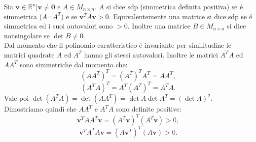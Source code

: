Sia $\mathbf{v} \in \mathbb{R}^n| \mathbf{v} \neq \mathbf{0}$ e $A \in M_{n \times n}$.
$A$ si dice sdp (simmetrica definita positiva) se \'e simmetrica ($A$=$A^T$) e se $\mathbf{v}^TA\mathbf{v} > 0.$
Equivalentemente una matrice si dice sdp se \'e simmetrica ed i suoi autovalori sono $> 0.$
Inoltre una matrice $B \in M_{n \times n}$ si dice nonsingolare se $\det{B} \neq 0.$
\\
Dal momento che il polinomio caratteristico \'e invariante per similitudine le matrici quadrate $A$ ed $A^T$ hanno gli stessi autovalori.
Inoltre le matrici $A^TA$ ed $AA^T$ sono simmetriche dal momento che:
\[
(AA^T)^T = (A^T)^TA^T = AA^T ,\] 
\[
(A^TA)^T = A^T(A^T)^T = A^TA.
\]
Vale poi $\det{(A^TA)} = \det{(AA^T)} = \det{A}\det{A^T} = (\det{A})^2.$
\\
Dimostriamo quindi che $AA^T$ e $A^TA$ sono definite positive:
\[
\mathbf{v}^TAA^T\mathbf{v} = (A^T\mathbf{v})^T(A^T\mathbf{v}) > 0, \]
\[
\mathbf{v}^TA^TA\mathbf{v} = (A\mathbf{v}^T)^T(A\mathbf{v}) > 0.
\]
